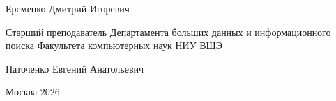 \begin{titlepage}
\begin{minipage}[t]{0.45\textwidth}
{\small
Еременко Дмитрий Игоревич
}

\vspace{0.8cm}

{\small
Старший преподаватель Департамента больших данных и информационного поиска Факультета компьютерных наук НИУ ВШЭ
}

{\small
Паточенко Евгений Анатольевич
}
\end{minipage}

\vspace{1.5cm}

\begin{center}
Москва 2026
\end{center}

\end{titlepage}
